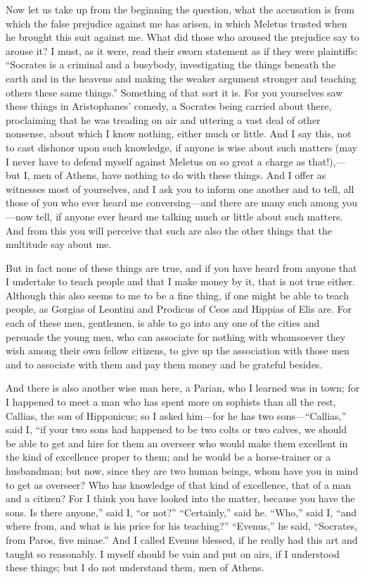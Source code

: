 Now let us take up from the beginning the question, what the accusation is from which the false prejudice against me has arisen, in which  Meletus trusted when he brought this suit against me. What did those who aroused the prejudice say to arouse it? I must, as it were, read their sworn statement as if they were plaintiffs: “Socrates is a criminal and a busybody, investigating the things beneath the earth and in the heavens and making the weaker argument stronger and  teaching others these same things.” Something of that sort it is. For you yourselves saw these things in Aristophanes' comedy, a Socrates being carried about there, proclaiming that he was treading on air and uttering a vast deal of other nonsense, about which I know nothing, either much or little. And I say this, not to cast dishonor upon such knowledge, if anyone is wise about such matters (may I never have to defend myself against Meletus on so great a charge as that!),—but I, men of Athens, have nothing to do with these things.  And I offer as witnesses most of yourselves, and I ask you to inform one another and to tell, all those of you who ever heard me conversing—and there are many such among you—now tell, if anyone ever heard me talking much or little about such matters. And from this you will perceive that such are also the other things that the multitude say about me.

But in fact none of these things are true, and if you have heard from anyone that I undertake to teach  people and that I make money by it, that is not true either. Although this also seems to me to be a fine thing, if one might be able to teach people, as Gorgias of Leontini and Prodicus of Ceos and Hippias of Elis are. For each of these men, gentlemen, is able to go into any one of the cities and persuade the young men, who can associate for nothing with whomsoever they wish among their own fellow citizens,  to give up the association with those men and to associate with them and pay them money and be grateful besides.

And there is also another wise man here, a Parian, who I learned was in town; for I happened to meet a man who has spent more on sophists than all the rest, Callias, the son of Hipponicus; so I asked him—for he has two sons—“Callias,” said I, “if your two sons had happened to be two colts or two calves, we should be able to get and hire for them an overseer who would make them  excellent in the kind of excellence proper to them; and he would be a horse-trainer or a husbandman; but now, since they are two human beings, whom have you in mind to get as overseer? Who has knowledge of that kind of excellence, that of a man and a citizen? For I think you have looked into the matter, because you have the sons. Is there anyone,” said I, “or not?” “Certainly,” said he. “Who,” said I, “and where from, and what is his price for his teaching?” “Evenus,” he said, “Socrates, from Paros, five minae.” And I called Evenus blessed,  if he really had this art and taught so reasonably. I myself should be vain and put on airs, if I understood these things; but I do not understand them, men of Athens.

